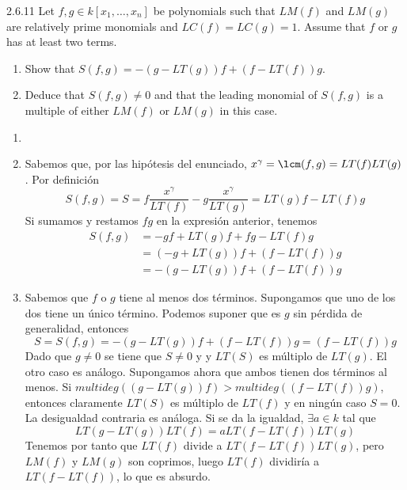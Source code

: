 \documentclass[twoside]{article}
\begin{document}
\begin{ejercicio}{2.6.11}
Let $f , g ∈ k[x_1,\dots , x_n]$ be polynomials such that $LM( f )$ and $LM(g)$ are relatively prime
monomials and $LC( f) = LC(g) = 1$. Assume that $f$ or $g$ has at least two terms.
\begin{enumerate}
\item Show that $S( f , g) = −(g − LT(g))f + (f − LT( f ))g$.
\item Deduce that $S( f , g) \neq 0$ and that the leading monomial of $S( f , g)$ is a multiple of
either $LM( f )$ or $LM(g)$ in this case.
\end{enumerate}
\end{ejercicio}
\begin{solucion}
\begin{enumerate}
\item[]
\item Sabemos que, por las hipótesis del enunciado, $x^\gamma=\lcm(f,g)=LT(f)LT(g)$. Por definición
$$S(f,g)= S=f\frac{x^{\gamma}}{LT(f)}-g\frac{x^{\gamma}}{LT(g)} = LT(g)f-LT(f)g
$$
Si sumamos y restamos $fg$ en la expresión anterior, tenemos
\begin{align*}
S(f,g)&=-gf+LT(g)f +fg-LT(f)g\\
&=(-g+LT(g))f+(f-LT(f))g \\
&=-(g-LT(g))f+(f-LT(f))g
\end{align*}
\item Sabemos que $f$ o $g$ tiene al menos dos términos. Supongamos que uno de los dos tiene un único término. Podemos suponer que es $g$ sin pérdida de generalidad, entonces
$$
S=S(f,g)=-(g-LT(g))f+(f-LT(f))g = (f-LT(f))g 
$$
Dado que $g\neq 0$ se tiene que $S\neq 0$ y y $LT(S)$ es múltiplo de $LT(g)$. El otro caso es análogo. Supongamos ahora que ambos tienen dos términos al menos. Si $multideg((g-LT(g))f)>multideg((f-LT(f))g)$, entonces claramente $LT(S)$ es múltiplo de $LT(f)$ y en ningún caso $S=0$. La desigualdad contraria es análoga. Si se da la igualdad, $\exists a \in k$ tal que
$$
LT(g-LT(g))LT(f) = a LT(f-LT(f))LT(g)
$$
Tenemos por tanto que $LT(f)$ divide a $LT(f-LT(f))LT(g)$, pero $LM(f)$ y $LM(g)$ son coprimos, luego $LT(f)$ dividiría a $LT(f-LT(f))$, lo que es absurdo.
\end{enumerate}
\end{solucion}

\newpage
\end{document}

